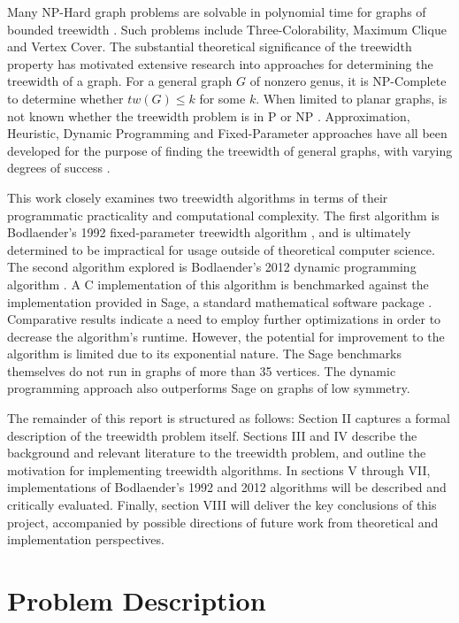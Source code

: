 \documentclass[12pt,conference]{IEEEtran}
\theoremstyle{plain}
\begin{document}
Many NP-Hard graph problems are solvable in polynomial time for graphs of bounded treewidth \cite{bodlaender-treewidth-power}. Such problems include Three-Colorability, Maximum Clique and Vertex Cover. The substantial theoretical significance of the treewidth property has motivated extensive research into approaches for determining the treewidth of a graph. For a general graph $G$ of nonzero genus, it is NP-Complete to determine whether $tw(G) \leq k$ for some $k$. When limited to planar graphs, is not known whether the treewidth problem is in P or NP \cite{planar-treewidth-unsolved}. Approximation, Heuristic, Dynamic Programming and Fixed-Parameter approaches have all been developed for the purpose of finding the treewidth of general graphs, with varying degrees of success \cite{treewidth-survey}. 

This work closely examines two treewidth algorithms in terms of their programmatic practicality and computational complexity. The first algorithm is Bodlaender's 1992 fixed-parameter treewidth algorithm \cite{bodlaender-1992}, and is ultimately determined to be impractical for usage outside of theoretical computer science. The second algorithm explored is Bodlaender's 2012 dynamic programming algorithm \cite{bodlaender-2012}. A C implementation of this algorithm is benchmarked against the implementation provided in Sage, a standard mathematical software package \cite{sage-original}. Comparative results indicate a need to employ further optimizations in order to decrease the algorithm's runtime. However, the potential for improvement to the algorithm is limited due to its exponential nature. The Sage benchmarks themselves do not run in graphs of more than 35 vertices. The dynamic programming approach also outperforms Sage on graphs of low symmetry.

The remainder of this report is structured as follows: Section II captures a formal description of the treewidth problem itself. Sections III and IV describe the background and relevant literature to the treewidth problem, and outline the motivation for implementing treewidth algorithms. In sections V through VII, implementations of Bodlaender's 1992 and 2012 algorithms will be described and critically evaluated. Finally, section VIII will deliver the key conclusions of this project, accompanied by possible directions of future work from theoretical and implementation perspectives.

\section{Problem Description}
\end{document}
